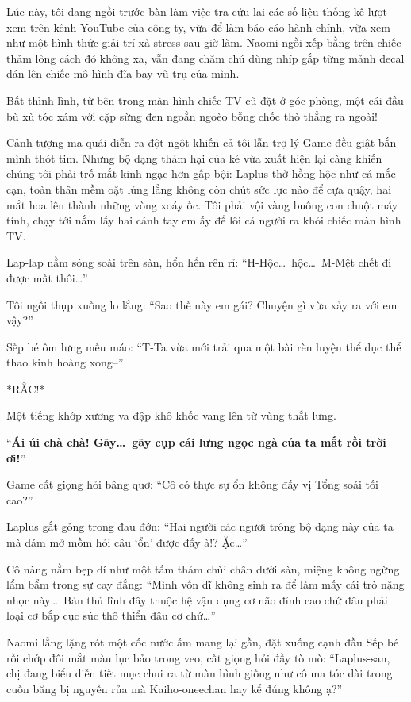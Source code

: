 \documentclass[../main.tex]{subfiles}
\begin{document}
Lúc này, tôi đang ngồi trước bàn làm việc tra cứu lại các số liệu thống kê lượt xem trên kênh YouTube của công ty, vừa để làm báo cáo hành chính, vừa xem như một hình thức giải trí xả stress sau giờ làm. Naomi ngồi xếp bằng trên chiếc thảm lông cách đó không xa, vẫn đang chăm chú dùng nhíp gắp từng mảnh decal dán lên chiếc mô hình đĩa bay vũ trụ của mình.

Bất thình lình, từ bên trong màn hình chiếc TV cũ đặt ở góc phòng, một cái đầu bù xù tóc xám với cặp sừng đen ngoằn ngoèo bỗng chốc thò thẳng ra ngoài!

Cảnh tượng ma quái diễn ra đột ngột khiến cả tôi lẫn trợ lý Game đều giật bắn mình thót tim. Nhưng bộ dạng thảm hại của kẻ vừa xuất hiện lại càng khiến chúng tôi phải trố mắt kinh ngạc hơn gấp bội: Laplus thở hồng hộc như cá mắc cạn, toàn thân mềm oặt lủng lẳng không còn chút sức lực nào để cựa quậy, hai mắt hoa lên thành những vòng xoáy ốc. Tôi phải vội vàng buông con chuột máy tính, chạy tới nắm lấy hai cánh tay em ấy để lôi cả người ra khỏi chiếc màn hình TV.

Lap-lap nằm sóng soài trên sàn, hổn hển rên rỉ: ``H-Hộc\dots\ hộc\dots\ M-Mệt chết đi được mất thôi\dots''

Tôi ngồi thụp xuống lo lắng: ``Sao thế này em gái? Chuyện gì vừa xảy ra với em vậy?''

Sếp bé ôm lưng mếu máo: ``T-Ta vừa mới trải qua một bài rèn luyện thể dục thể thao kinh hoàng xong--''

*RẮC!*

Một tiếng khớp xương va đập khô khốc vang lên từ vùng thắt lưng.

``\textbf{Ái úi chà chà! Gãy\dots\ gãy cụp cái lưng ngọc ngà của ta mất rồi trời ơi!}''

Game cất giọng hỏi bâng quơ: ``Cô có thực sự ổn không đấy vị Tổng soái tối cao?''

Laplus gắt gỏng trong đau đớn: ``Hai người các ngươi trông bộ dạng này của ta mà dám mở mồm hỏi câu `ổn' được đấy à!? Ặc\dots''

Cô nàng nằm bẹp dí như một tấm thảm chùi chân dưới sàn, miệng không ngừng lẩm bẩm trong sự cay đắng: ``Mình vốn dĩ không sinh ra để làm mấy cái trò nặng nhọc này\dots\ Bản thủ lĩnh đây thuộc hệ vận dụng cơ não đỉnh cao chứ đâu phải loại cơ bắp cục súc thô thiển đâu cơ chứ\dots''

Naomi lẳng lặng rót một cốc nước ấm mang lại gần, đặt xuống cạnh đầu Sếp bé rồi chớp đôi mắt màu lục bảo trong veo, cất giọng hỏi đầy tò mò: ``Laplus-san, chị đang biểu diễn tiết mục chui ra từ màn hình giống như cô ma tóc dài trong cuốn băng bị nguyền rủa mà Kaiho-oneechan hay kể đúng không ạ?''
\end{document}
